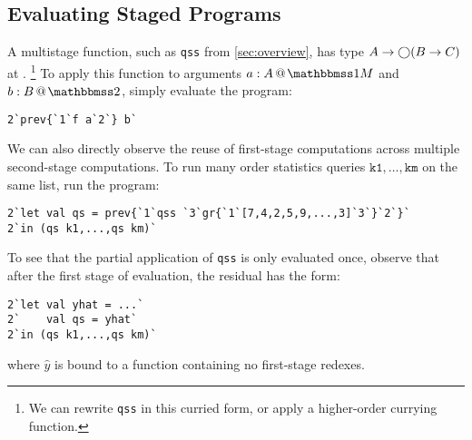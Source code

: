\subsection{Evaluating Staged Programs}

A multistage function, such as \texttt{qss} from \ref{sec:overview}, has
type $A\to \bigcirc (B \to C)$ at \bbonem.%
\footnote{We can rewrite \texttt{qss} in this curried form, or apply a
higher-order currying function.}
To apply this function to arguments $\colmix a A$ and $\coltwo b B$, simply
evaluate the program:
\begin{lstlisting}
2`prev{`1`f a`2`} b`
\end{lstlisting}

We can also directly observe the reuse of first-stage computations across
multiple second-stage computations. To run many order statistics queries
$\texttt{k1},\dots,\texttt{km}$ on the same list, run the program:
\begin{lstlisting}
2`let val qs = prev{`1`qss `3`gr{`1`[7,4,2,5,9,...,3]`3`}`2`}`
2`in (qs k1,...,qs km)`
\end{lstlisting}
To see that the partial application of \texttt{qss} is only evaluated once,
observe that after the first stage of evaluation, the residual has the form:
\begin{lstlisting}
2`let val yhat = ...`
2`    val qs = yhat`
2`in (qs k1,...,qs km)`
\end{lstlisting}
where $\hat{y}$ is bound to a function containing no first-stage redexes.
